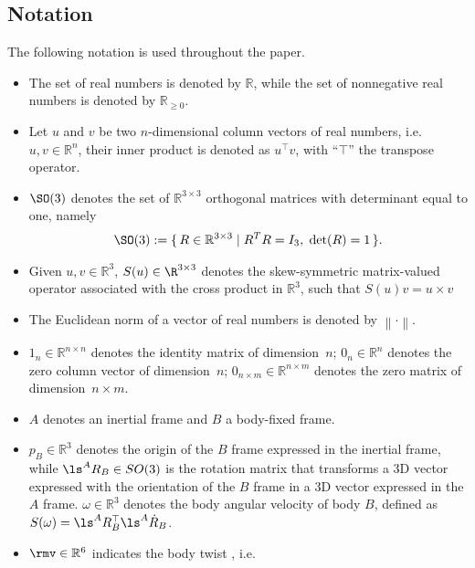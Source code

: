 \subsection{Notation}
The following notation is used throughout the paper.
\begin{itemize}
 \item The set of real numbers is denoted by $\mathbb{R}$, while the set of nonnegative real numbers is denoted by $\mathbb{R}_{\geq 0}$. 
 \item Let $u$ and $v$ be two $n$-dimensional column vectors of real numbers, i.e. $u,v \in \mathbb{R}^n$, 
 their inner product is denoted as $u^\top v$, with ``$\top$'' the transpose operator.
\item
$\SO(3)$ denotes
the set of $\mathbb{R}^{3 \times 3}$ orthogonal matrices with determinant equal to one, namely
\begin{align*}
\SO(3) :=  \{\, R \in \mathbb{R}^{3 \times 3} \mid R^T R = I_3 , \hspace{0.3em} \operatorname{det}(R) = 1 \,\}.
\end{align*}
\item Given $u,v \in \mathbb{R}^3$, $S(u) \in \R^{3\times3}$ denotes the skew-symmetric matrix-valued operator associated with the cross product in 
  $\mathbb{R}^3$, such that $S(u) v = u \times v$
 \item The Euclidean norm of a vector of real numbers is denoted by $\left\|\cdot \right\|$.
\item $1_n \in \mathbb{R}^{n \times n}$ denotes the identity matrix of dimension~$n$; 
$0_n \in \mathbb{R}^n$ denotes the zero column vector of dimension~$n$; $0_{n \times m} \in \mathbb{R}^{n \times m}$ denotes the zero matrix of dimension~$n \times m$.
\item $A$ denotes an inertial frame and $B$ a body-fixed frame.
\item $p_B \in \mathbb{R}^3$ denotes the origin of the $B$ frame expressed in the inertial frame, while $\ls^A R_B \in SO(3)$ is the rotation matrix that transforms a 3D vector expressed with the orientation of the $B$ frame in a 3D vector expressed in the $A$ frame. $\omega \in \mathbb{R}^3$ denotes the body angular velocity of body $B$, defined as $S(\omega) = \ls^A R_B^\top \ls^A \dot{R}_B$.
\item $\rmv \in \mathbb{R}^6$ indicates the body twist \cite[Chapter 3]{murray1994mathematical}, i.e.

\end{itemize}
